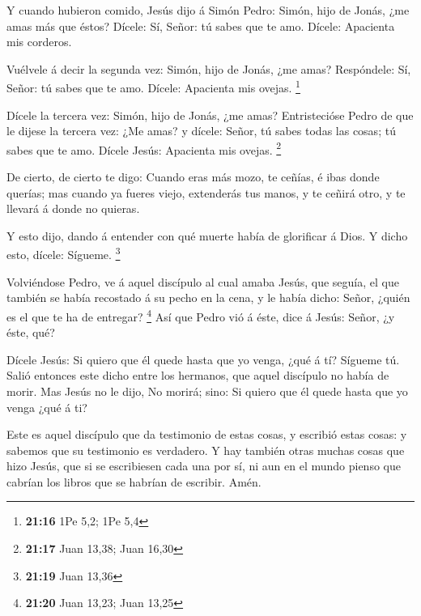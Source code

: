 Y cuando hubieron comido, Jesús dijo á Simón Pedro:
Simón, hijo de Jonás, ¿me amas más que éstos? Dícele: Sí, Señor: tú
sabes que te amo. Dícele: Apacienta mis corderos.

 Vuélvele á decir la segunda vez: Simón, hijo de Jonás,
¿me amas? Respóndele: Sí, Señor: tú sabes que te amo. Dícele: Apacienta
mis ovejas. \footnote{\textbf{21:16} 1Pe 5,2; 1Pe 5,4}

 Dícele la tercera vez: Simón, hijo de Jonás, ¿me amas?
Entristecióse Pedro de que le dijese la tercera vez: ¿Me amas? y dícele:
Señor, tú sabes todas las cosas; tú sabes que te amo. Dícele Jesús:
Apacienta mis ovejas. \footnote{\textbf{21:17} Juan 13,38; Juan 16,30}

 De cierto, de cierto te digo: Cuando eras más mozo, te
ceñías, é ibas donde querías; mas cuando ya fueres viejo, extenderás tus
manos, y te ceñirá otro, y te llevará á donde no quieras.

 Y esto dijo, dando á entender con qué muerte había de
glorificar á Dios. Y dicho esto, dícele: Sígueme. \footnote{\textbf{21:19}
  Juan 13,36}

 Volviéndose Pedro, ve á aquel discípulo al cual amaba
Jesús, que seguía, el que también se había recostado á su pecho en la
cena, y le había dicho: Señor, ¿quién es el que te ha de entregar?
\footnote{\textbf{21:20} Juan 13,23; Juan 13,25}  Así que
Pedro vió á éste, dice á Jesús: Señor, ¿y éste, qué?

 Dícele Jesús: Si quiero que él quede hasta que yo venga,
¿qué á tí? Sígueme tú.  Salió entonces este dicho entre
los hermanos, que aquel discípulo no había de morir. Mas Jesús no le
dijo, No morirá; sino: Si quiero que él quede hasta que yo venga ¿qué á
ti?

 Este es aquel discípulo que da testimonio de estas
cosas, y escribió estas cosas: y sabemos que su testimonio es verdadero.
 Y hay también otras muchas cosas que hizo Jesús, que si
se escribiesen cada una por sí, ni aun en el mundo pienso que cabrían
los libros que se habrían de escribir. Amén.
